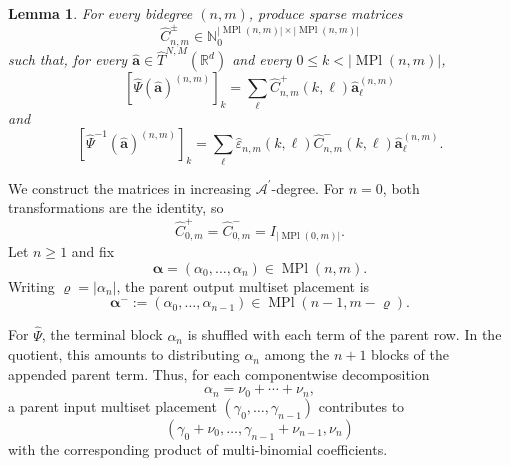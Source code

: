 \documentclass{amsart}
\newtheorem{lemma}[theorem]{Lemma}
\theoremstyle{definition}
\theoremstyle{remark}
\begin{document}
\begin{lemma}
\label{lem:symmetrized_transformations}
For every bidegree $(n,m)$,
 produce sparse matrices
\[
    \widehat{C}^{\pm}_{n,m}
    \in
    \mathbb{N}_0^{
        |\operatorname{MPl}(n,m)|
        \times
        |\operatorname{MPl}(n,m)|
    }
\]
such that, for every
$\widehat{\mathbf{a}}
\in
\widehat{T}^{N,M}(\mathbb{R}^d)$ and every
$0\leq k<|\operatorname{MPl}(n,m)|$,
\[
    \left[
        \widehat{\Psi}
        (\widehat{\mathbf{a}})^{(n,m)}
    \right]_k
    =
    \sum_{\ell}
    \widehat{C}^{+}_{n,m}(k,\ell)
    \widehat{\mathbf{a}}^{(n,m)}_\ell
\]
and
\[
    \left[
        \widehat{\Psi}^{-1}
        (\widehat{\mathbf{a}})^{(n,m)}
    \right]_k
    =
    \sum_{\ell}
    \widehat{\varepsilon}_{n,m}(k,\ell)
    \widehat{C}^{-}_{n,m}(k,\ell)
    \widehat{\mathbf{a}}^{(n,m)}_\ell.
\]
\end{lemma}

We construct the matrices in increasing
$\mathcal{A}^{\prime}$-degree. For $n=0$, both transformations are the
identity, so
\[
    \widehat{C}^{+}_{0,m}
    =
    \widehat{C}^{-}_{0,m}
    =
    I_{|\operatorname{MPl}(0,m)|}.
\]
Let $n\geq1$ and fix
\[
    \boldsymbol{\alpha}
    =
    (\alpha_0,\ldots,\alpha_n)
    \in
    \operatorname{MPl}(n,m).
\]
Writing
$\varrho=|\alpha_n|$, the parent output multiset placement is
\[
    \boldsymbol{\alpha}^{-}
    :=
    (\alpha_0,\ldots,\alpha_{n-1})
    \in
    \operatorname{MPl}(n-1,m-\varrho).
\]

For $\widehat{\Psi}$, the terminal block $\alpha_n$ is shuffled with
each term of the parent row. In the quotient, this amounts to distributing
$\alpha_n$ among the $n+1$ blocks of the appended parent term. Thus, for
each componentwise decomposition
\[
    \alpha_n
    =
    \nu_0+\cdots+\nu_n,
\]
a parent input multiset placement
$(\gamma_0,\ldots,\gamma_{n-1})$ contributes to
\[
    \left(
        \gamma_0+\nu_0,
        \ldots,
        \gamma_{n-1}+\nu_{n-1},
        \nu_n
    \right)
\]
with the corresponding product of multi-binomial coefficients.
\end{document}
